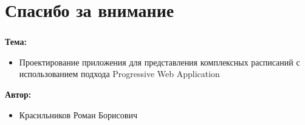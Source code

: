 
\section{Спасибо за внимание}

\begin{frame}
    \frametitle{\insertsection}

    \textbf{Тема:}
    \begin{itemize}
        \item Проектирование приложения для представления комплексных расписаний с использованием подхода Progressive Web Application
    \end{itemize}

    \textbf{Автор:}
    \begin{itemize}
        \item Красильников Роман Борисович
    \end{itemize}

\end{frame}
